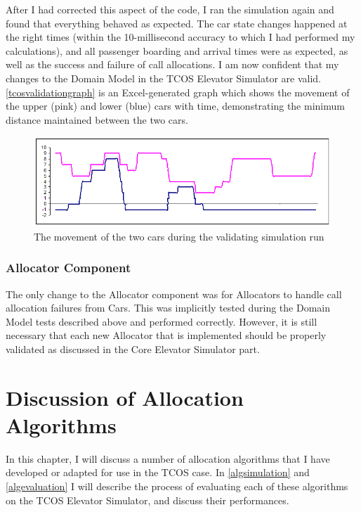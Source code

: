 \documentclass{UoYCSproject}
\begin{document}
After I had corrected this aspect of the code, I ran the simulation again and found that everything behaved as expected.  The car state changes happened at the right times (within the 10-millisecond accuracy to which I had performed my calculations), and all passenger boarding and arrival times were as expected, as well as the success and failure of call allocations.  I am now confident that my changes to the Domain Model in the TCOS Elevator Simulator are valid.  \autoref{tcosvalidationgraph} is an Excel-generated graph which shows the movement of the upper (pink) and lower (blue) cars with time, demonstrating the minimum distance maintained between the two cars.

\begin{figure} [h]
	\centering
	\includegraphics[width=\linewidth,keepaspectratio]{tcos_validation_movement_graph.png}
	\caption{The movement of the two cars during the validating simulation run}
	\label{tcosvalidationgraph}
\end{figure}

\subsection{Allocator Component}
The only change to the Allocator component was for Allocators to handle call allocation failures from Cars.  This was implicitly tested during the Domain Model tests described above and performed correctly.  However, it is still necessary that each new Allocator that is implemented should be properly validated as discussed in the Core Elevator Simulator part.

\chapter{Discussion of Allocation Algorithms}
\label{algdiscussion}

In this chapter, I will discuss a number of allocation algorithms that I have developed or adapted for use in the TCOS case.  In \autoref{algsimulation} and \autoref{algevaluation} I will describe the process of evaluating each of these algorithms on the TCOS Elevator Simulator, and discuss their performances.
\end{document}
